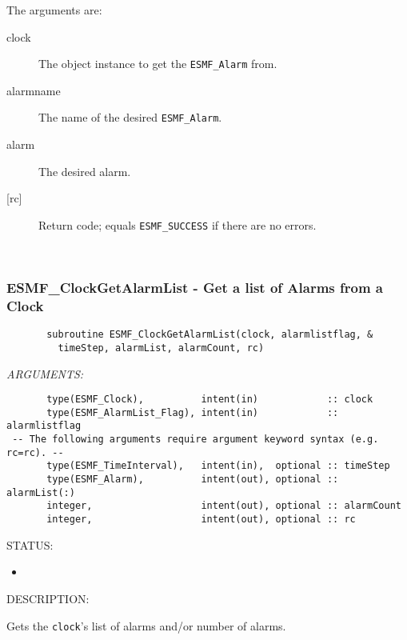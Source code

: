        The arguments are:
       \begin{description}
       \item[clock]
            The object instance to get the {\tt ESMF\_Alarm} from.
       \item[alarmname]
            The name of the desired {\tt ESMF\_Alarm}.
       \item[alarm]
            The desired alarm.
       \item[{[rc]}]
            Return code; equals {\tt ESMF\_SUCCESS} if there are no errors.
       \end{description}
   
 
\mbox{}\hrulefill\ 
 
\subsubsection [ESMF\_ClockGetAlarmList] {ESMF\_ClockGetAlarmList - Get a list of Alarms from a Clock}


 
\begin{verbatim}       subroutine ESMF_ClockGetAlarmList(clock, alarmlistflag, &
         timeStep, alarmList, alarmCount, rc)
 \end{verbatim}{\em ARGUMENTS:}
\begin{verbatim}       type(ESMF_Clock),          intent(in)            :: clock
       type(ESMF_AlarmList_Flag), intent(in)            :: alarmlistflag
 -- The following arguments require argument keyword syntax (e.g. rc=rc). --
       type(ESMF_TimeInterval),   intent(in),  optional :: timeStep
       type(ESMF_Alarm),          intent(out), optional :: alarmList(:)
       integer,                   intent(out), optional :: alarmCount
       integer,                   intent(out), optional :: rc\end{verbatim}
{\sf STATUS:}
   \begin{itemize}
   \item{}
   \end{itemize}
  
{\sf DESCRIPTION:\\ }


       Gets the {\tt clock}'s list of alarms and/or number of alarms.
  
